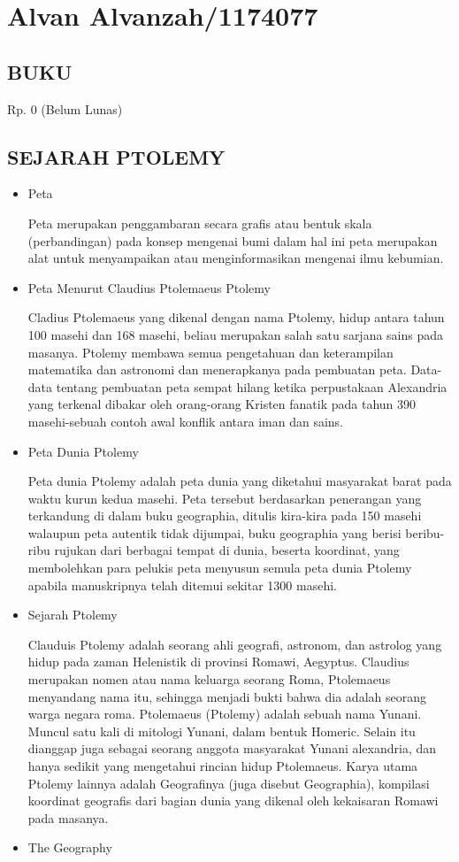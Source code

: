 \section{Alvan Alvanzah/1174077}
\subsection{BUKU}
Rp. 0 (Belum Lunas)

\subsection{SEJARAH PTOLEMY}
\begin{itemize}
    \item Peta
    
Peta merupakan penggambaran secara grafis atau bentuk skala (perbandingan) pada konsep mengenai bumi dalam hal ini peta merupakan alat untuk menyampaikan atau menginformasikan mengenai ilmu kebumian.
    \item Peta Menurut Claudius Ptolemaeus Ptolemy
    
Cladius Ptolemaeus yang dikenal dengan nama Ptolemy, hidup antara tahun 100 masehi dan 168 masehi, beliau merupakan salah satu sarjana sains pada masanya. Ptolemy membawa semua pengetahuan dan keterampilan matematika dan astronomi dan menerapkanya pada pembuatan peta. Data-data tentang pembuatan peta sempat hilang ketika perpustakaan Alexandria yang terkenal dibakar oleh orang-orang Kristen fanatik pada tahun 390 masehi-sebuah contoh awal konflik antara iman dan sains.
    \item Peta Dunia Ptolemy
    
Peta dunia Ptolemy adalah peta dunia yang diketahui masyarakat barat pada waktu kurun kedua masehi. Peta tersebut berdasarkan penerangan yang terkandung di dalam buku geographia, ditulis kira-kira pada 150 masehi walaupun peta autentik tidak dijumpai, buku geographia yang berisi beribu-ribu rujukan dari berbagai tempat di dunia, beserta koordinat, yang membolehkan para pelukis peta menyusun semula peta dunia Ptolemy apabila manuskripnya telah ditemui sekitar 1300 masehi.
    \item Sejarah Ptolemy

Clauduis Ptolemy adalah seorang ahli geografi, astronom, dan astrolog yang hidup pada zaman Helenistik di provinsi Romawi, Aegyptus. Claudius merupakan nomen atau nama keluarga seorang Roma, Ptolemaeus menyandang nama itu, sehingga menjadi bukti bahwa dia adalah seorang warga negara roma. Ptolemaeus (Ptolemy) adalah sebuah nama Yunani. Muncul satu kali di mitologi Yunani, dalam bentuk Homeric. Selain itu dianggap juga sebagai seorang anggota masyarakat Yunani alexandria, dan hanya sedikit yang mengetahui rincian hidup Ptolemaeus. Karya utama Ptolemy lainnya adalah Geografinya (juga disebut Geographia), kompilasi koordinat geografis dari bagian dunia yang dikenal oleh kekaisaran Romawi pada masanya.
    \item The Geography
    

\end{itemize}
